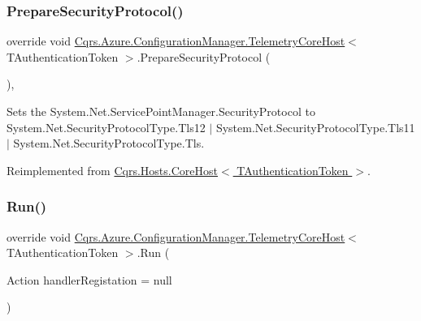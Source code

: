 \subsubsection{\texorpdfstring{Prepare\+Security\+Protocol()}{PrepareSecurityProtocol()}}
{\footnotesize\ttfamily override void \hyperlink{classCqrs_1_1Azure_1_1ConfigurationManager_1_1TelemetryCoreHost}{Cqrs.\+Azure.\+Configuration\+Manager.\+Telemetry\+Core\+Host}$<$ T\+Authentication\+Token $>$.Prepare\+Security\+Protocol (\begin{DoxyParamCaption}{ }\end{DoxyParamCaption})\hspace{0.3cm}{\ttfamily [protected]}, {\ttfamily [virtual]}}



Sets the System.\+Net.\+Service\+Point\+Manager.\+Security\+Protocol to System.\+Net.\+Security\+Protocol\+Type.\+Tls12 $\vert$ System.\+Net.\+Security\+Protocol\+Type.\+Tls11 $\vert$ System.\+Net.\+Security\+Protocol\+Type.\+Tls. 



Reimplemented from \hyperlink{classCqrs_1_1Hosts_1_1CoreHost_a220ba43ac810c074c8881e8f598ff746_a220ba43ac810c074c8881e8f598ff746}{Cqrs.\+Hosts.\+Core\+Host$<$ T\+Authentication\+Token $>$}.

\mbox{\label{classCqrs_1_1Azure_1_1ConfigurationManager_1_1TelemetryCoreHost_a1d7406fe5dd09d6d6e449522a0a2f637_a1d7406fe5dd09d6d6e449522a0a2f637}} 
\subsubsection{\texorpdfstring{Run()}{Run()}}
{\footnotesize\ttfamily override void \hyperlink{classCqrs_1_1Azure_1_1ConfigurationManager_1_1TelemetryCoreHost}{Cqrs.\+Azure.\+Configuration\+Manager.\+Telemetry\+Core\+Host}$<$ T\+Authentication\+Token $>$.Run (\begin{DoxyParamCaption}\item[{Action}]{handler\+Registation = {\ttfamily null} }\end{DoxyParamCaption})\hspace{0.3cm}{\ttfamily [virtual]}}



